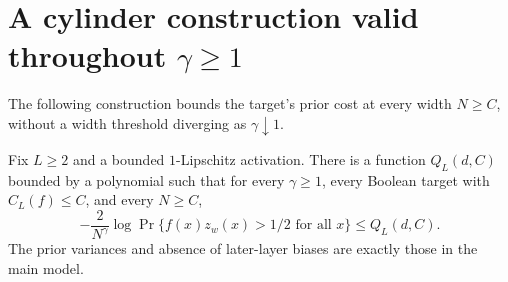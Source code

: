 \section{A cylinder construction valid throughout \texorpdfstring{$\gamma\geq1$}{gamma >= 1}}
The following construction bounds the target's prior cost at every width $N\geq C$,
without a width threshold diverging as $\gamma\downarrow1$.

\begin{proposition}
Fix $L\geq2$ and a bounded $1$-Lipschitz activation. There is a function $Q_L(d,C)$ bounded by a polynomial such that for every $\gamma\geq1$, every Boolean target with
$C_L(f)\leq C$, and every $N\geq C$,
\[
 -\frac{2}{N^\gamma}\log\Pr\{f(x)z_w(x)>1/2\text{ for all }x\}
 \leq Q_L(d,C).
\]
The prior variances and absence of later-layer biases are exactly those in the
main model.
\end{proposition}
